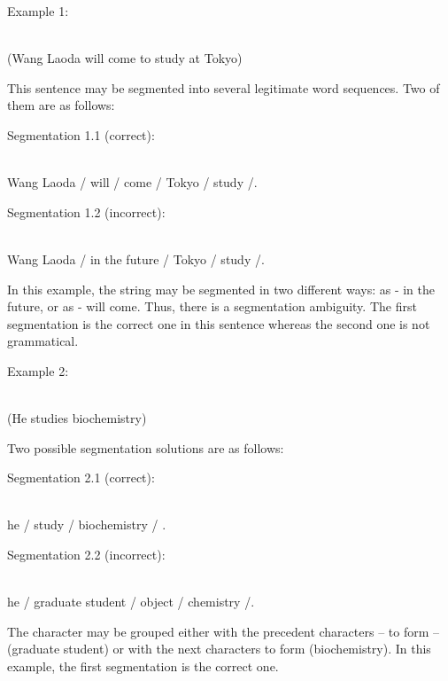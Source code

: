 \noindent Example 1:
\begin{minipage}[t]{3in}
 \\
(Wang Laoda will come to study at Tokyo)
\end{minipage}
\medskip

This sentence may be segmented into several legitimate word sequences. Two of them are as follows:

\noindent Segmentation 1.1 (correct): 
\begin{minipage}[t]{3in}
 \\
Wang Laoda / will  / come /  Tokyo  /  study /.
\end{minipage}
\medskip

\noindent Segmentation 1.2 (incorrect):
\begin{minipage}[t]{3in}
 \\
Wang Laoda / in the future / Tokyo / study /.
\end{minipage}
\medskip 

In this example, the string   may be segmented in two different ways: as   - in the future, or as   - will 
come. Thus, there is a segmentation ambiguity. The first segmentation is the correct one in this sentence whereas the 
second one is not grammatical.

\noindent Example 2:   
\begin{minipage}[t]{3in}
 \\
(He studies biochemistry)
\end{minipage}
\medskip

Two possible segmentation solutions are as follows:

\noindent Segmentation 2.1 (correct):
\begin{minipage}[t]{3in}
 \\
he  /   study   / biochemistry /  .
\end{minipage}
\medskip

\noindent Segmentation 2.2 (incorrect):  
\begin{minipage}[t]{3in}
 \\
he  / graduate student / object /  chemistry /.
\end{minipage}
\medskip

The character   may be grouped either with the precedent characters --  to form --   (graduate student) or 
with the next characters   to form   (biochemistry). In this example, the first segmentation is the 
correct one.

